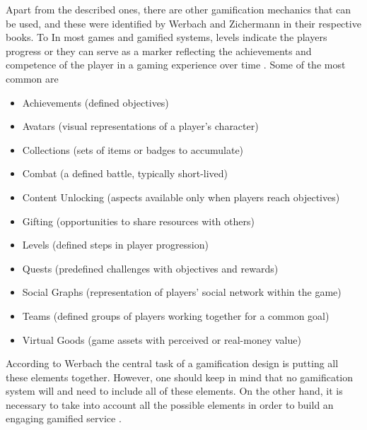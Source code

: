 Apart from the described ones, there are other gamification mechanics that can be used, and these were identified by Werbach and Zichermann in their respective books. To 
In most games and gamified systems, levels indicate the players progress or they can serve as a marker reflecting the achievements and competence of the player in a gaming experience over time \cite{zichermann2011gamification}. Some of the most common are \cite{zichermann2011gamification, werbach2012win} 
\begin{itemize}
\item Achievements (defined objectives)
\item Avatars (visual representations of a player's character)
\item Collections (sets of items or badges to accumulate)
\item Combat (a defined battle, typically short-lived)
\item Content Unlocking (aspects available only when players reach objectives)
\item Gifting (opportunities to share resources with others)
\item Levels (defined steps in player progression)
\item Quests (predefined challenges with objectives and rewards)
\item Social Graphs (representation of players' social network within the game)
\item Teams (defined groups of players working together for a common goal)
\item Virtual Goods (game assets with perceived or real-money value)
\end{itemize}
According to Werbach the central task of a gamification design is putting all these elements together. However, one should keep in mind that no gamification system will and need to include all of these elements. On the other hand, it is necessary to take into account all the possible elements in order to build an engaging gamified service \cite{werbach2012win}. 



